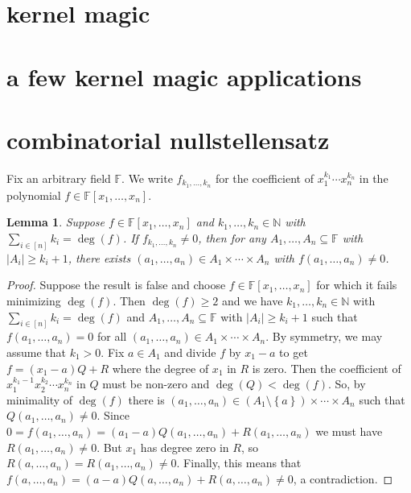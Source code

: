 \documentclass{amsbook}
\theoremstyle{plain}
\newtheorem{lemma}{Lemma}
\numberwithin{equation}{chapter}
\newcommand{\set}[1]{\left\{ #1 \right\}}
\newcommand{\card}[1]{\left|#1\right|}
\newcommand{\irange}[1]{\left[#1\right]}
\newcommand{\IN}{\mathbb{N}}
\begin{document}
\section*{kernel magic}
\section*{a few kernel magic applications}
\section*{combinatorial nullstellensatz}
Fix an arbitrary field $\mathbb{F}$. We write $f_{k_1, \ldots, k_n}$ for the coefficient of $x_1^{k_1}\cdots x_n^{k_n}$ in the polynomial $f \in \mathbb{F}[x_1, \ldots, x_n]$. 
\begin{lemma}
Suppose $f \in \mathbb{F}[x_1, \ldots, x_n]$ and $k_1, \ldots, k_n \in \IN$ with $\sum_{i \in \irange{n}} k_i = \deg(f)$.  If $f_{k_1, \ldots, k_n} \ne 0$, then for any $A_1, \ldots, A_n \subseteq \mathbb{F}$ with $\card{A_i} \ge k_i + 1$, there exists $(a_1, \ldots, a_n) \in A_1 \times \cdots \times A_n$ with $f(a_1, \ldots, a_n) \ne 0$.
\end{lemma}
\begin{proof}
Suppose the result is false and choose $f \in \mathbb{F}[x_1, \ldots, x_n]$ for which it fails 
minimizing $\deg(f)$. Then $\deg(f) \ge 2$ and we have $k_1, \ldots, k_n \in \IN$ with $\sum_{i \in \irange{n}} k_i = \deg(f)$ and 
$A_1, \ldots, A_n \subseteq \mathbb{F}$ with $\card{A_i} \ge k_i + 1$ such that $f(a_1, \ldots, a_n) = 0$ for all $(a_1, \ldots, a_n) \in A_1 \times \cdots \times A_n$.  
By symmetry, we may assume that $k_1 > 0$.  Fix $a \in A_1$ and divide $f$ by $x_1 - a$ to get $f = (x_1 - a)Q + R$ where the degree of $x_1$ in $R$ is zero.  
Then the coefficient of $x_1^{k_1-1}x_2^{k_2} \cdots x_n^{k_n}$ in $Q$ must be non-zero and $\deg(Q) < \deg(f)$.  So, by minimality of $\deg(f)$ there 
is $(a_1, \ldots, a_n) \in (A_1 \setminus \set{a}) \times \cdots \times A_n$ such that $Q(a_1,\ldots, a_n) \ne 0$.  
Since $0 = f(a_1,\ldots, a_n) = (a_1 - a)Q(a_1,\ldots, a_n) + R(a_1,\ldots, a_n)$ we must have $R(a_1,\ldots, a_n) \ne 0$.  
But $x_1$ has degree zero in $R$, so $R(a,\ldots, a_n) = R(a_1,\ldots, a_n) \ne 0$.  
Finally, this means that $f(a,\ldots, a_n) = (a-a)Q(a,\ldots, a_n) + R(a,\ldots, a_n) \ne 0$, a contradiction.
\end{proof}
\end{document}
